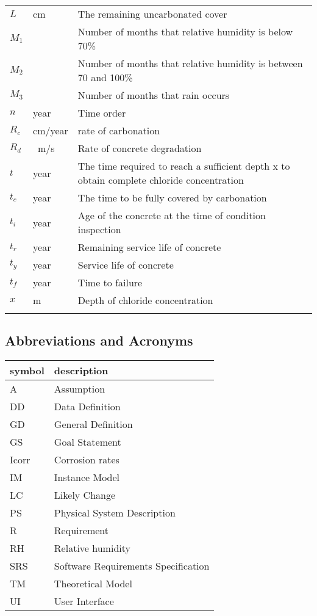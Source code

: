 \documentclass[12pt]{article}
\begin{document}
\begin{longtable*}{l l p{12cm}}
$L$ & cm & The remaining uncarbonated cover \\
$M_1$ & \SI{}{} & Number of months that relative humidity is below 70\%\\
$M_2$ & \SI{}{} & Number of months that relative humidity is between 70 and 100\% \\
$M_3$ & \SI{}{} & Number of months that rain occurs\\

$n$ & year & Time order\\

$R_c$ & cm/year & rate of carbonation \\
$R_d$ & \si[per-mode=symbol]{{}\meter\per\second} & Rate of concrete degradation \\

$t$ & year & The time required to reach a sufficient depth x to obtain complete chloride concentration\\
$t_c$ & year & The time to be fully covered by carbonation\\
$t_i$ & year & Age of the concrete at the time of condition inspection\\
$t_r$ & year & Remaining service life of concrete\\
$t_y$ & year & Service life of concrete\\
$t_f$ & year & Time to failure\\

$x$ & m & Depth of chloride concentration \\
\\ 
\bottomrule
\end{longtable*}

\subsection{Abbreviations and Acronyms}

\renewcommand{\arraystretch}{1.2}
\begin{tabular}{l l} 
  \toprule		
  \textbf{symbol} & \textbf{description}\\
  \midrule 
  A & Assumption\\
  DD & Data Definition\\
  GD & General Definition\\
  GS & Goal Statement\\
  Icorr & Corrosion rates\\
  IM & Instance Model\\
  LC & Likely Change\\
  PS & Physical System Description\\
  R & Requirement\\
  RH & Relative humidity \\
  SRS & Software Requirements Specification\\
  TM & Theoretical Model\\
  UI & User Interface \\
  \bottomrule
\end{tabular}\\
\end{document}
